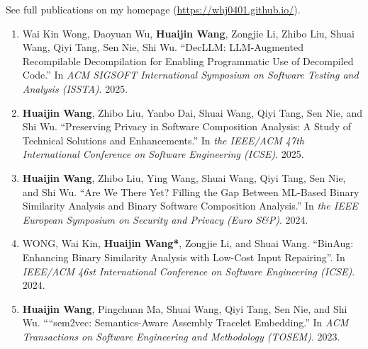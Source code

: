 See full publications on my homepage (\href{https://whj0401.github.io/}{https://whj0401.github.io/}).
\begin{enumerate}
    \item Wai Kin Wong, Daoyuan Wu, \textbf{Huaijin Wang}, Zongjie Li, Zhibo Liu, Shuai Wang, Qiyi Tang, Sen Nie, Shi Wu.
    ``DecLLM: LLM-Augmented Recompilable Decompilation for Enabling Programmatic Use of Decompiled Code.''
    In \textit{ACM SIGSOFT International Symposium on Software Testing and Analysis (ISSTA)}. 2025.
    \item \textbf{Huaijin Wang}, Zhibo Liu, Yanbo Dai, Shuai Wang, Qiyi Tang, Sen Nie, and Shi Wu.
    ``Preserving Privacy in Software Composition Analysis: A Study of Technical Solutions and Enhancements.''
    In \textit{the IEEE/ACM 47th International Conference on Software Engineering (ICSE)}. 2025.
    \item \textbf{Huaijin Wang}, Zhibo Liu, Ying Wang, Shuai Wang, Qiyi Tang, Sen Nie, and Shi Wu.
    ``Are We There Yet? Filling the Gap Between ML-Based Binary Similarity Analysis and Binary Software Composition Analysis.''
    In \textit{the IEEE European Symposium on Security and Privacy (Euro S\&P)}. 2024.
    
    
    \item WONG, Wai Kin, \textbf{Huaijin Wang*}, Zongjie Li, and Shuai Wang.
    ``BinAug: Enhancing Binary Similarity Analysis with Low-Cost Input Repairing''.
    In \textit{IEEE/ACM 46st International Conference on Software Engineering (ICSE)}. 2024.
    

    \item \textbf{Huaijin Wang}, Pingchuan Ma, Shuai Wang, Qiyi Tang, Sen Nie, and Shi Wu.
    ``“sem2vec: Semantics-Aware Assembly Tracelet Embedding.''
    In \textit{ACM Transactions on Software Engineering and Methodology (TOSEM)}. 2023.
    

\end{enumerate}
